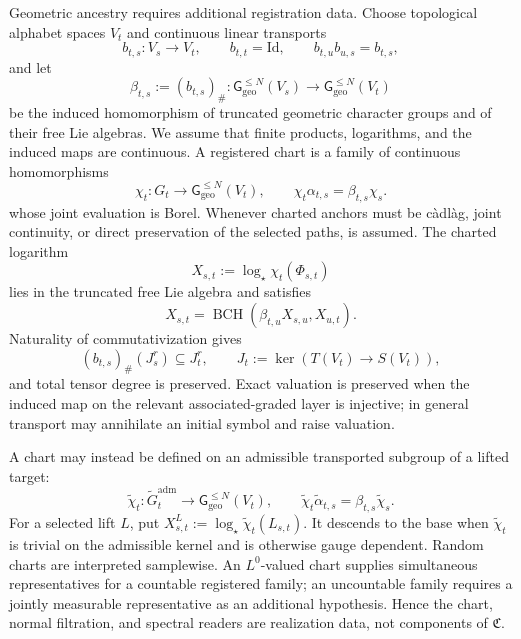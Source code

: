 \documentclass[10pt,reqno]{amsart}
\theoremstyle{plain}
\theoremstyle{definition}
\theoremstyle{remark}
\begin{document}
Geometric ancestry requires additional registration data.  Choose
topological alphabet spaces \(V_t\) and continuous linear transports
\begin{equation}
 b_{t,s}:V_s\longrightarrow V_t,
 \qquad b_{t,t}={\mathrm{Id}},
 \qquad b_{t,u}b_{u,s}=b_{t,s},
 \label{cc:eq-alphabet-transport}
\end{equation}
and let
\[
 \beta_{t,s}:=(b_{t,s})_\#:
 \mathsf G_{\mathrm{geo}}^{\le N}(V_s)
 \longrightarrow
 \mathsf G_{\mathrm{geo}}^{\le N}(V_t)
\]
be the induced homomorphism of truncated geometric character groups and of
their free Lie algebras.  We assume that finite products, logarithms, and
the induced maps are continuous.  A registered chart is a family of
continuous homomorphisms
\begin{equation}
 \chi_t:G_t\longrightarrow\mathsf G_{\mathrm{geo}}^{\le N}(V_t),
 \qquad
 \chi_t\alpha_{t,s}=\beta_{t,s}\chi_s.
 \label{cc:eq-geometric-chart}
\end{equation}
whose joint evaluation is Borel.  Whenever charted anchors must be càdlàg,
joint continuity, or direct preservation of the selected paths, is assumed.
The charted logarithm
\begin{equation}
 X_{s,t}:=\log_\star\chi_t(\Phi_{s,t})
 \label{cc:eq-charted-logarithm}
\end{equation}
lies in the truncated free Lie algebra and satisfies
\[
 X_{s,t}
 ={\operatorname{BCH}}\!\left(\beta_{t,u}X_{s,u},X_{u,t}\right).
\]
Naturality of commutativization gives
\[
 (b_{t,s})_\#(J_s^r)\subseteq J_t^r,
 \qquad
 J_t:=\ker\!\left(T(V_t)\longrightarrow S(V_t)\right),
\]
and total tensor degree is preserved.  Exact valuation is preserved when
the induced map on the relevant associated-graded layer is injective; in
general transport may annihilate an initial symbol and raise valuation.

A chart may instead be defined on an admissible transported subgroup of a
lifted target:
\[
 \widetilde\chi_t:\widetilde G_t^{\mathrm{adm}}
 \longrightarrow\mathsf G_{\mathrm{geo}}^{\le N}(V_t),
 \qquad
 \widetilde\chi_t\widetilde\alpha_{t,s}
 =\beta_{t,s}\widetilde\chi_s.
\]
For a selected lift \(L\), put
\(X^L_{s,t}:=\log_\star\widetilde\chi_t(L_{s,t})\).  It descends to the
base when \(\widetilde\chi_t\) is trivial on the admissible kernel and is
otherwise gauge dependent.  Random charts are interpreted samplewise.
An \(L^0\)-valued chart supplies simultaneous representatives for a
countable registered family; an uncountable family requires a jointly
measurable representative as an additional hypothesis.  Hence the chart,
normal filtration, and spectral readers are realization data, not
components of \(\mathfrak C\).
\end{document}
